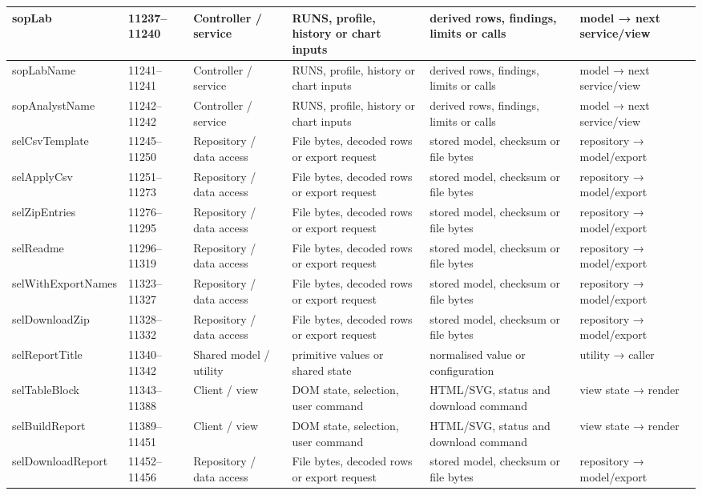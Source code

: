 \begin{landscape}
\begin{longtable}{@{}p{3.2cm}p{1.45cm}p{2.7cm}p{4.0cm}p{4.0cm}p{3.0cm}@{}}
sopLab & 11237--11240 & Controller / service & RUNS, profile, history or chart inputs & derived rows, findings, limits or calls & model → next service/view \\\hline
sopLabName & 11241--11241 & Controller / service & RUNS, profile, history or chart inputs & derived rows, findings, limits or calls & model → next service/view \\\hline
sopAnalystName & 11242--11242 & Controller / service & RUNS, profile, history or chart inputs & derived rows, findings, limits or calls & model → next service/view \\\hline
selCsvTemplate & 11245--11250 & Repository / data access & File bytes, decoded rows or export request & stored model, checksum or file bytes & repository → model/export \\\hline
selApplyCsv & 11251--11273 & Repository / data access & File bytes, decoded rows or export request & stored model, checksum or file bytes & repository → model/export \\\hline
selZipEntries & 11276--11295 & Repository / data access & File bytes, decoded rows or export request & stored model, checksum or file bytes & repository → model/export \\\hline
selReadme & 11296--11319 & Repository / data access & File bytes, decoded rows or export request & stored model, checksum or file bytes & repository → model/export \\\hline
selWithExportNames & 11323--11327 & Repository / data access & File bytes, decoded rows or export request & stored model, checksum or file bytes & repository → model/export \\\hline
selDownloadZip & 11328--11332 & Repository / data access & File bytes, decoded rows or export request & stored model, checksum or file bytes & repository → model/export \\\hline
selReportTitle & 11340--11342 & Shared model / utility & primitive values or shared state & normalised value or configuration & utility → caller \\\hline
selTableBlock & 11343--11388 & Client / view & DOM state, selection, user command & HTML/SVG, status and download command & view state → render \\\hline
selBuildReport & 11389--11451 & Client / view & DOM state, selection, user command & HTML/SVG, status and download command & view state → render \\\hline
selDownloadReport & 11452--11456 & Repository / data access & File bytes, decoded rows or export request & stored model, checksum or file bytes & repository → model/export \\\hline

\end{longtable}
\end{landscape}

